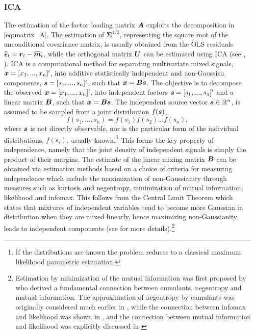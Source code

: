 \subsubsection{ICA}
The estimation of the factor loading matrix \( \mbox{\boldmath$A$} \) exploits the decomposition
in \eqref{eq:matrix_A}. The estimation of ${\mathbf{\Sigma}^{1/2}}$,
representing the square root of the unconditional covariance matrix, is usually
obtained from the OLS residuals \( \widehat{\mbox{\boldmath$\epsilon$}}_t = \mbox{\boldmath$r$}_t - \widehat{\mbox{\boldmath$m$}}_t \),
while the orthogonal matrix $\mbox{\boldmath$U$}$ can be estimated using ICA (see \cite{Broda2009}, \cite{Zhang2009}).
ICA is a computational method for separating multivariate mixed signals, $\mbox{\boldmath$x$}=[x_1, ..., x_{n}]'$,
into additive statistically independent and non-Gaussian components, $\mbox{\boldmath$s$}=[s_1, ..., s_{n}]'$,
such that $\mbox{\boldmath$x$}=\mbox{\boldmath$B$} \mbox{\boldmath$s$}$. The objective is to decompose the observed $\mbox{\boldmath$x$}=[x_1, ..., x_{n}]'$,
into independent factors $\mbox{\boldmath$s$}=[s_1, ..., s_{n}]'$ and a linear matrix $\mbox{\boldmath$B$}$,
such that $\mbox{\boldmath$x$}=\mbox{\boldmath$B$} \mbox{\boldmath$s$}$. The independent source vector $\mbox{\boldmath$s$} \in {\mathbb{R}^n}$,
is assumed to be sampled from a joint distribution $f(\mbox{\boldmath$s$})$,
\begin{equation}\label{eq:ica1}
f({s_1},...,{s_n}) = f({s_1})f({s_2})...f({s_n}),
\end{equation}
where $\mbox{\boldmath$s$}$ is not directly observable, nor is the particular form of the individual
distributions, $f(s_i)$, usually known.\footnote{If the distributions are known the
problem reduces to a classical maximum likelihood parametric estimation.} This forms
the key property of independence, namely that the joint density of independent signals
is simply the product of their margins. The estimate of the linear mixing matrix
$\mbox{\boldmath$B$}$ can be obtained via estimation methods based on a choice of criteria for
measuring independence which include the maximization of non-Gaussianity through
measures such as kurtosis and negentropy, minimization of mutual information,
likelihood and infomax. This follows from the Central Limit Theorem which states
that mixtures of independent variables tend to become more Gaussian in distribution
when they are mixed linearly, hence maximizing non-Gaussianity leads to independent
components (see \cite{Hyvaerinen2000} for more details).\footnote{Estimation by
minimization of the mutual information was first proposed by \cite{Comon1994}
who derived a fundamental connection between cumulants, negentropy and mutual information.
The approximation of negentropy by cumulants was originally considered much earlier
in \cite{Jones1987}, while the connection between infomax and likelihood
was shown in \cite{Pearlmutter1997}, and the connection between mutual
information and likelihood was explicitly discussed in \cite{Cardoso2000}}
